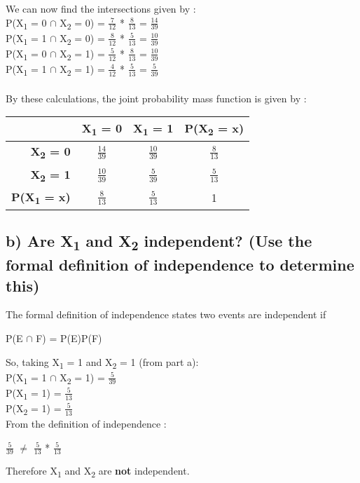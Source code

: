 \documentclass{report}
\begin{document}
		We can now find the intersections given by :\\
		P(X\textsubscript{1} = 0 $\cap$ X\textsubscript{2} = 0) = $\frac{7}{12}$ * $\frac{8}{13}$ = $\frac{14}{39}$\\
		P(X\textsubscript{1} = 1 $\cap$ X\textsubscript{2} = 0) = $\frac{8}{12}$ * $\frac{5}{13}$ = $\frac{10}{39}$\\
		P(X\textsubscript{1} = 0 $\cap$ X\textsubscript{2} = 1) = $\frac{5}{12}$ * $\frac{8}{13}$ = $\frac{10}{39}$\\
		P(X\textsubscript{1} = 1 $\cap$ X\textsubscript{2} = 1) = $\frac{4}{12}$ * $\frac{5}{13}$ = $\frac{5}{39}$\\
		\\
		By these calculations, the joint probability mass function is given by :
		\begin{table}[h!]
			\begin{center}
				\label{tab:table1}
				\begin{tabular}{r|c|c|c} %
					\textbf{} & \textbf{X\textsubscript{1} = 0} & \textbf{X\textsubscript{1} = 1} & \textbf{P(X\textsubscript{2} = x)}\\
					\hline
					\textbf{X\textsubscript{2} = 0} & $\frac{14}{39}$ & $\frac{10}{39}$ & $\frac{8}{13}$\\
					\textbf{X\textsubscript{2} = 1} & $\frac{10}{39}$ & $\frac{5}{39}$ & $\frac{5}{13}$\\
					\textbf{P(X\textsubscript{1} = x)} & $\frac{8}{13}$ & $\frac{5}{13}$ & 1\\
				\end{tabular}
			\end{center}
		\end{table}
		
		
		
		
		
		
		
		
		
		\subsection*{b) Are X\textsubscript{1} and X\textsubscript{2} independent? (Use the formal definition of independence to determine this)}
		The formal definition of independence states two events are independent if 
		\begin{center}
			P(E $\cap$ F) = P(E)P(F)
		\end{center}
		So, taking X\textsubscript{1} = 1 and X\textsubscript{2} = 1 (from part a):\\
		P(X\textsubscript{1} = 1 $\cap$ X\textsubscript{2} = 1) = $\frac{5}{39}$\\
		P(X\textsubscript{1} = 1) = $\frac{5}{13}$\\
		P(X\textsubscript{2} = 1) = $\frac{5}{13}$\\
		From the definition of independence :
		\begin{center}
			$\frac{5}{39}$ $\neq$ $\frac{5}{13}$ * $\frac{5}{13}$
		\end{center}
		Therefore X\textsubscript{1} and X\textsubscript{2} are \textbf{not} independent.
		
\end{document}
